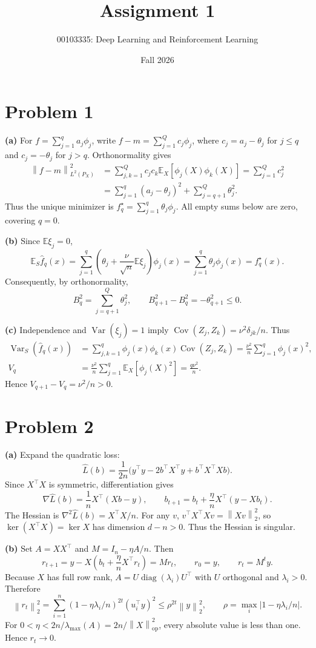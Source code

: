 \documentclass[11pt]{article}
\title{Assignment 1}
\author{00103335: Deep Learning and Reinforcement Learning}
\date{Fall 2026}
\newcommand{\E}{\mathbb E}
\newcommand{\norm}[1]{\left\lVert#1\right\rVert}
\begin{document}
\maketitle

\section*{Problem 1}
\textbf{(a)} For $f=\sum_{j=1}^q a_j\phi_j$, write
$f-m=\sum_{j=1}^Q c_j\phi_j$, where $c_j=a_j-\theta_j$ for $j\leq q$
and $c_j=-\theta_j$ for $j>q$. Orthonormality gives
\begin{align*}
 \norm{f-m}_{L^2(P_X)}^2
 &=\sum_{j,k=1}^Q c_jc_k\E_X[\phi_j(X)\phi_k(X)]
 =\sum_{j=1}^Q c_j^2\\
 &=\sum_{j=1}^q(a_j-\theta_j)^2+\sum_{j=q+1}^Q\theta_j^2.
\end{align*}
Thus the unique minimizer is $f_q^\star=\sum_{j=1}^q\theta_j\phi_j$.
All empty sums below are zero, covering $q=0$.

\textbf{(b)} Since $\E\xi_j=0$,
\[
 \E_S\widehat f_q(x)=\sum_{j=1}^q
 \left(\theta_j+\frac\nu{\sqrt n}\E\xi_j\right)\phi_j(x)
 =\sum_{j=1}^q\theta_j\phi_j(x)=f_q^\star(x).
\]
Consequently, by orthonormality,
\[
 B_q^2=\sum_{j=q+1}^Q\theta_j^2,
 \qquad B_{q+1}^2-B_q^2=-\theta_{q+1}^2\leq0.
\]

\textbf{(c)} Independence and $\operatorname{Var}(\xi_j)=1$ imply
$\operatorname{Cov}(Z_j,Z_k)=\nu^2\delta_{jk}/n$. Thus
\begin{align*}
 \operatorname{Var}_S(\widehat f_q(x))
 &=\sum_{j,k=1}^q\phi_j(x)\phi_k(x)\operatorname{Cov}(Z_j,Z_k)
 =\frac{\nu^2}{n}\sum_{j=1}^q\phi_j(x)^2,\\
 V_q&=\frac{\nu^2}{n}\sum_{j=1}^q\E_X[\phi_j(X)^2]
 =\frac{q\nu^2}{n}.
\end{align*}
Hence $V_{q+1}-V_q=\nu^2/n>0$.

\section*{Problem 2}
\textbf{(a)} Expand the quadratic loss:
\[
 \widehat L(b)=\frac1{2n}
 \big(y^\top y-2b^\top X^\top y+b^\top X^\top Xb\big).
\]
Since $X^\top X$ is symmetric, differentiation gives
\[
 \nabla\widehat L(b)=\frac1n X^\top(Xb-y),\qquad
 b_{t+1}=b_t+\frac\eta n X^\top(y-Xb_t).
\]
The Hessian is $\nabla^2\widehat L(b)=X^\top X/n$.
For any $v$, $v^\top X^\top Xv=\norm{Xv}_2^2$, so
$\ker(X^\top X)=\ker X$ has dimension $d-n>0$.
Thus the Hessian is singular.

\textbf{(b)} Set $A=XX^\top$ and $M=I_n-\eta A/n$. Then
\[
 r_{t+1}=y-X\left(b_t+\frac\eta nX^\top r_t\right)=Mr_t,
 \qquad r_0=y,\qquad r_t=M^t y.
\]
Because $X$ has full row rank, $A=U\operatorname{diag}(\lambda_i)U^\top$
with $U$ orthogonal and $\lambda_i>0$. Therefore
\[
 \norm{r_t}_2^2=\sum_{i=1}^n
 (1-\eta\lambda_i/n)^{2t}(u_i^\top y)^2
 \leq\rho^{2t}\norm y_2^2,
 \qquad \rho=\max_i|1-\eta\lambda_i/n|.
\]
For $0<\eta<2n/\lambda_{\max}(A)=2n/\norm X_{\mathrm{op}}^2$,
every absolute value is less than one. Hence $r_t\to0$.
\end{document}
